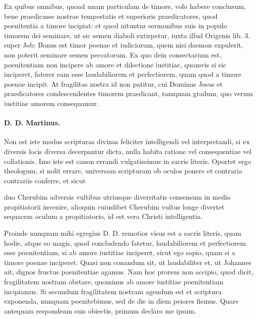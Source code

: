 Ex quibus omnibus, quoad unam particulam de timore, volo habere conclusum, bene praedicasse nostrae tempestatis et superioris praedicatores, quod poenitentia a timore incipiat: et quod nituntur sermonibus suis in populo timorem dei seminare, ut sic semen diaboli extirpetur, iuxta illud Origenis lib. 3. super Job: Bonus est timor poenae et iudiciorum, quem nisi daemon expulerit, non poterit seminare semen peccatorum. Ex quo dein consectarium est, poenitentiam non incipere ab amore et dilectione iustitiae, quamvis si sic inciperet, faterer eam esse laudabiliorem et perfectiorem, quam quod a timore poenae incipit. At fragilitas nostra id non patitur, cui Dominus Jesus et praedicatores condescendentes timorem praedicant, tamquam gradum, quo verum iustitiae amorem consequamur.

\paragraph*{D. D. Martinus.}

Non est iste modus scripturas divinas feliciter intelligendi vel interpretandi, si ex diversis locis diversa decerpantur dicta, nulla habita ratione vel consequentiae vel collationis. Imo iste est canon errandi vulgatissimus in sacris literis. Oportet ergo theologum, si nolit errare, universam scripturam ob oculos ponere et contraria contrariis conferre, et sicut

duo Cherubim adversis vultibus utriusque diversitatis consensum in medio propitiatorii invenire, alioquin cuiuslibet Cherubim vultus longe divertet sequacem oculum a propitiatorio, id est vera Christi intelligentia.

Proinde nunquam mihi egregius D. D. remotior visus est a sacris literis, quam hodie, atque eo magis, quod concludendo fatetur, laudabiliorem et perfectiorem esse poenitentiam, si ab amore iustitiae inciperet, sicut ego sapio, quam si a timore poenae inciperet. Quasi non conandum sit, ut laudabiliter et, ut Johannes ait, dignos fructus poenitentiae agamus. Nam hoc prorsus non accipio, quod dicit, fragilitatem nostram obstare, quominus ab amore iustitiae poenitentiam incipiamus. Si secundum fragilitatem nostram agendum est et scriptura exponenda, nunquam poenitebimus, sed de die in diem peiores fiemus. Quare antequam respondeam suis obiectis, primum declaro me ipsum.


